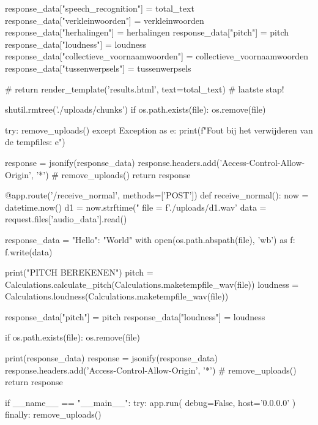 \begin{python}
   response_data["speech_recognition"] = total_text
   response_data["verkleinwoorden"] = verkleinwoorden
   response_data["herhalingen"] = herhalingen
   response_data["pitch"] = pitch
   response_data["loudness"] = loudness
   response_data["collectieve_voornaamwoorden"] = collectieve_voornaamwoorden
   response_data["tussenwerpsels"] = tussenwerpsels

   # return render_template('results.html', text=total_text)
   # laatste stap!

   shutil.rmtree('./uploads/chunks')
   if os.path.exists(file):
        os.remove(file)

   try:
        remove_uploads()
   except Exception as e:
        print(f"Fout bij het verwijderen van de tempfiles: {e}")

   response = jsonify(response_data)
   response.headers.add('Access-Control-Allow-Origin', '*')
   # remove_uploads()
   return response


@app.route('/receive_normal', methods=['POST'])
def receive_normal():
   now = datetime.now()
   d1 = now.strftime("%
   file = f'./uploads/{d1}.wav'
   data = request.files['audio_data'].read()

   response_data = {"Hello": "World"}
   with open(os.path.abspath(file), 'wb') as f:
   f.write(data)

   print("PITCH BEREKENEN")
   pitch = Calculations.calculate_pitch(Calculations.maketempfile_wav(file))
   loudness = Calculations.loudness(Calculations.maketempfile_wav(file))

   response_data["pitch"] = pitch
   response_data["loudness"] = loudness

   if os.path.exists(file):
        os.remove(file)

   print(response_data)
   response = jsonify(response_data)
   response.headers.add('Access-Control-Allow-Origin', '*')
   # remove_uploads()
   return response


if __name__ == "__main__":
   try:
        app.run(
            debug=False,
            host='0.0.0.0'
        )
   finally:
        remove_uploads()

\end{python}

